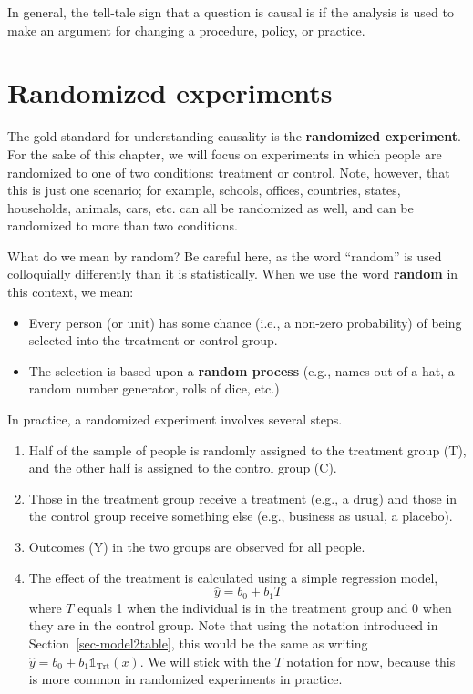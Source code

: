 \documentclass[
  letterpaper,
  DIV=11,
  numbers=noendperiod]{scrreprt}
\providecommand{\tightlist}{%
  \setlength{\itemsep}{0pt}\setlength{\parskip}{0pt}}\usepackage{longtable,booktabs,array}
\theoremstyle{definition}
\theoremstyle{remark}
\begin{document}
In general, the tell-tale sign that a question is causal is if the
analysis is used to make an argument for changing a procedure, policy,
or practice.

\hypertarget{sec-randomized-experiments}{%
\section{Randomized experiments}\label{sec-randomized-experiments}}

The gold standard for understanding causality is the \textbf{randomized
experiment}. For the sake of this chapter, we will focus on experiments
in which people are randomized to one of two conditions: treatment or
control. Note, however, that this is just one scenario; for example,
schools, offices, countries, states, households, animals, cars, etc. can
all be randomized as well, and can be randomized to more than two
conditions.

What do we mean by random? Be careful here, as the word ``random'' is
used colloquially differently than it is statistically. When we use the
word \textbf{random} in this context, we mean:

\begin{itemize}
\tightlist
\item
  Every person (or unit) has some chance (i.e., a non-zero probability)
  of being selected into the treatment or control group.
\item
  The selection is based upon a \textbf{random process} (e.g., names out
  of a hat, a random number generator, rolls of dice, etc.)
\end{itemize}

In practice, a randomized experiment involves several steps.

\begin{enumerate}
\def\labelenumi{\arabic{enumi}.}
\tightlist
\item
  Half of the sample of people is randomly assigned to the treatment
  group (T), and the other half is assigned to the control group (C).
\item
  Those in the treatment group receive a treatment (e.g., a drug) and
  those in the control group receive something else (e.g., business as
  usual, a placebo).
\item
  Outcomes (Y) in the two groups are observed for all people.
\item
  The effect of the treatment is calculated using a simple regression
  model, \[\hat{y} = b_0 + b_1T \] where \(T\) equals 1 when the
  individual is in the treatment group and 0 when they are in the
  control group. Note that using the notation introduced in
  Section~\ref{sec-model2table}, this would be the same as writing
  \(\hat{y} = b_0 + b_1\mathbb{1}_{\mbox{Trt}}(x)\). We will stick with
  the \(T\) notation for now, because this is more common in randomized
  experiments in practice.
\end{enumerate}
\end{document}
